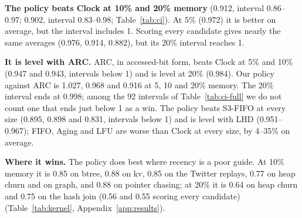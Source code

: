 \documentclass{article}
\newcommand{\figdata}{figures/data}   %
\newcommand{\clock}{Clock\xspace}
\newcommand{\finding}[1]{\textbf{#1}\hspace{0.4em}}
\begin{document}
\begin{table}[t]
\caption{The comparisons that matter, with 95\% intervals (resampling workloads, then
streams; one seed per comparison). Bold: the whole interval is below 1. ``Linear, 32
sampled'' is our policy, ``linear, global'' the score over all candidates. Every cell
covers all 74 streams. All comparisons: Table~\ref{tab:ci-full}.}
\label{tab:ci}
\vskip 0.1in
\begin{center}
\resizebox{\linewidth}{!}{}
\end{center}
\vskip -0.1in
\end{table}

\finding{The policy beats \clock at 10\% and 20\% memory} (0.912, interval 0.86--0.97;
0.902, interval 0.83--0.98; Table~\ref{tab:ci}). At 5\% (0.972) it is better on average,
but the interval includes 1. Scoring every candidate gives nearly the same averages
(0.976, 0.914, 0.882), but its 20\% interval reaches 1.

\finding{It is level with ARC.} ARC, in accessed-bit form, beats \clock at 5\% and 10\%
(0.947 and 0.943, intervals below 1) and is level at 20\% (0.984). Our policy against
ARC is 1.027, 0.968 and 0.916 at 5, 10 and 20\% memory. The 20\% interval ends at 0.998;
among the 92 intervals of Table~\ref{tab:ci-full} we do not count one that ends just below
1 as a win. The policy beats S3-FIFO at every size (0.895, 0.898 and
0.831, intervals below 1) and is level with LHD (0.951--0.967); FIFO, Aging and LFU are
worse than \clock at every size, by 4--35\% on average.

\finding{Where it wins.} The policy does best where recency is a poor guide. At 10\%
memory it is 0.85 on btree, 0.88 on kv, 0.85 on the Twitter replays, 0.77 on heap churn
and on graph, and 0.88 on pointer chasing; at 20\% it is 0.64 on heap churn and 0.75 on the
hash join (0.56 and 0.55 scoring every candidate) (Table~\ref{tab:kernel},
Appendix~\ref{app:results}).
\end{document}

